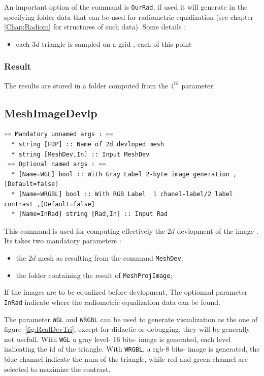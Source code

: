 An important option of the command is {\tt OurRad},  if used it will generate in
the specifying folder data that can be used for radiometric equalization (see
chapter \ref{Chap:Radiom} for structures of such data). Some details :

\begin{itemize}
    \item each $3d$ triangle is sampled on a grid , each of this point 

\end{itemize}



\subsubsection{Result}

The results are stored in a folder computed from the $4^{th}$ parameter.



\subsection{MeshImageDevlp}

\begin{verbatim}
== Mandatory unnamed args : ==
  * string [FDP] :: Name of 2d devloped mesh
  * string [MeshDev,In] :: Input MeshDev
 == Optional named args : ==
  * [Name=WGL] bool :: With Gray Label 2-byte image generation ,[Default=false]
  * [Name=WRGBL] bool :: With RGB Label  1 chanel-label/2 label contrast ,[Default=false]
  * [Name=InRad] string [Rad,In] :: Input Rad
\end{verbatim}

This command is used for computing effectively the $2d$ devlopment of the image . Its takes two mandatory
parameters :

\begin{itemize}
   \item the $2d$ mesh as resulting from the command {\tt MeshDev};
   \item the folder containing the result of {\tt MeshProjImage};
\end{itemize}

If the images are to be equalized before devlopment, The optionnal parameter {\tt InRad} 
indicate where the radiometric equalization data can be found.  

The parameter {\tt WGL} and {\tt WRGBL} can be used to generate visualization as the one
of figure~\ref{fig:RealDevTri}, except for didactic or debugging, they will be generally not usefull.
 With {\tt WGL} a gray level- $16$ bits- image is generated,
each level indicating the id of the triangle. With {\tt WRGBL}, a rgb-$8$ bits- image is generated, the 
blue channel indicate the num of the triangle, while red and green channel are selected to maximize
the contrast.



